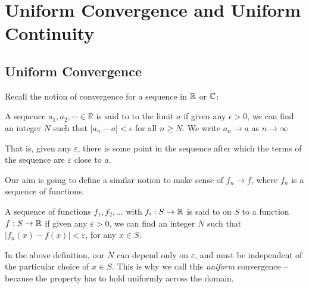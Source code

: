 \documentclass[a4paper]{scrartcl}
\begin{document}




\section{Uniform Convergence and Uniform Continuity} 

\subsection{Uniform Convergence}
Recall the notion of convergence for a sequence in $\mathbb{R}$ or $\mathbb{C}$:

\begin{definition}
    A sequence $a_{1}, a_{2}, \cdots \in \mathbb{R}$ is said to  to the limit $a$ if given any $\epsilon>0$, we can find an integer $N$ such that $\left|a_{n}-a\right|<\epsilon$ for all $n \geq N$. We write $a_{n} \rightarrow a$ as $n \rightarrow \infty$
\end{definition}

That is, given any $\varepsilon$, there is some point in the sequence after which the terms of the sequence are $\varepsilon$ close to $a$. 

Our aim is going to define a similar notion to make sense of $f_n \rightarrow f$, where $f_n$ is a sequence of functions.

\begin{definition}
    A sequence of functions $f_1, f_2, \dots$ with $f_i : S \rightarrow \mathbb{R}$ is said to  on $S$ to a function $f:S \rightarrow \mathbb{R}$ if given any $\varepsilon > 0$, we can find an integer $N$ such that $|f_n(x) - f(x)| < \varepsilon$, for any $x \in S$.
\end{definition}

\begin{remark}
    In the above definition, our $N$ can depend only on $\varepsilon$, and must be independent of the particular choice of $x \in S$. This is why we call this \emph{uniform} convergence -- because the property has to hold uniformly across the domain. 
\end{remark}
\end{document}
